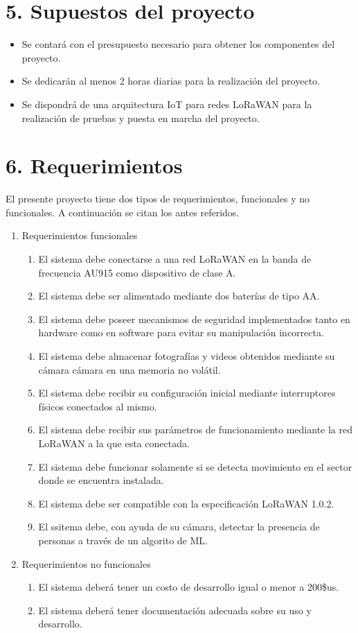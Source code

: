 \documentclass[
11pt, %
codirector, %
]{plan}
\begin{document}
\section{5. Supuestos del proyecto}
\label{sec:supuestos}

\begin{itemize}
	\item Se contará con el presupuesto necesario para obtener los componentes del proyecto.
	\item Se dedicarán al menos 2 horas diarias para la realización del proyecto.
	\item Se dispondrá de una arquitectura IoT para redes LoRaWAN para la realización de pruebas y puesta en marcha del proyecto.
\end{itemize}

\section{6. Requerimientos}
\label{sec:requerimientos}

El presente proyecto tiene dos tipos de requerimientos, funcionales y no funcionales. A continuación se citan los antes referidos.

\begin{enumerate}
	\item Requerimientos funcionales
		\begin{enumerate}
			\item El sistema debe conectarse a una red LoRaWAN en la banda de frecuencia AU915 como dispositivo de clase A.
			\item El sistema debe ser alimentado mediante dos baterías de tipo AA.
			\item El sistema debe poseer mecanismos de seguridad implementados tanto en hardware como en software para evitar su manipulación incorrecta.
			\item El sistema debe almacenar fotografías y videos obtenidos mediante su cámara cámara en una memoria no volátil.
			\item El sistema debe recibir su configuración inicial mediante interruptores físicos conectados al mismo.
			\item El sistema debe recibir sus parámetros de funcionamiento mediante la red LoRaWAN a la que esta conectada.
			\item El sistema debe funcionar solamente si se detecta movimiento en el sector donde se encuentra instalada.
			\item El sistema debe ser compatible con la especificación LoRaWAN 1.0.2.
			\item El ssitema debe, con ayuda de su cámara, detectar la presencia de personas a través de un algorito de ML.
		\end{enumerate}
	\item Requerimientos no funcionales
		\begin{enumerate}
			\item El sistema deberá tener un costo de desarrollo igual o menor a 200\$us.
			\item El sistema deberá tener documentación adecuada sobre su uso y desarrollo.
		\end{enumerate}
\end{enumerate}
\end{document}
